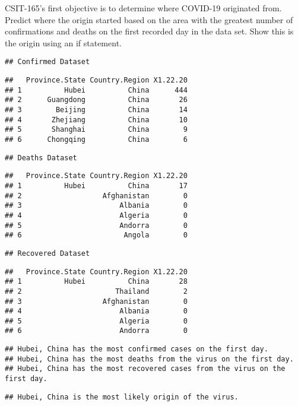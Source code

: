 \documentclass[
]{article}
\begin{document}
CSIT-165's first objective is to determine where COVID-19 originated
from. Predict where the origin started based on the area with the
greatest number of confirmations and deaths on the first recorded day in
the data set. Show this is the origin using an if statement.

\begin{verbatim}
## Confirmed Dataset
\end{verbatim}

\begin{verbatim}
##   Province.State Country.Region X1.22.20
## 1          Hubei          China      444
## 2      Guangdong          China       26
## 3        Beijing          China       14
## 4       Zhejiang          China       10
## 5       Shanghai          China        9
## 6      Chongqing          China        6
\end{verbatim}

\begin{verbatim}
## Deaths Dataset
\end{verbatim}

\begin{verbatim}
##   Province.State Country.Region X1.22.20
## 1          Hubei          China       17
## 2                   Afghanistan        0
## 3                       Albania        0
## 4                       Algeria        0
## 5                       Andorra        0
## 6                        Angola        0
\end{verbatim}

\begin{verbatim}
## Recovered Dataset
\end{verbatim}

\begin{verbatim}
##   Province.State Country.Region X1.22.20
## 1          Hubei          China       28
## 2                      Thailand        2
## 3                   Afghanistan        0
## 4                       Albania        0
## 5                       Algeria        0
## 6                       Andorra        0
\end{verbatim}

\begin{verbatim}
## Hubei, China has the most confirmed cases on the first day. 
## Hubei, China has the most deaths from the virus on the first day. 
## Hubei, China has the most recovered cases from the virus on the first day.
\end{verbatim}

\begin{verbatim}
## Hubei, China is the most likely origin of the virus.
\end{verbatim}
\end{document}
